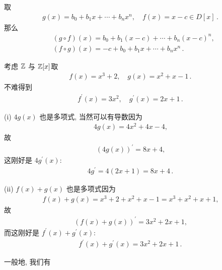 \begin{example}
    取
    \begin{align*}
        g(x) = b_0 + b_1 x + \cdots + b_n x^n, \quad f(x) = x - c \in D[x] \period
    \end{align*}
    那么
    \begin{align*}
         & (g \circ f) (x) = b_0 + b_1 (x-c) + \cdots + b_n (x-c)^n,     \\
         & (f \circ g) (x) = -c + b_0 + b_1 x + \cdots + b_n x^n \period
    \end{align*}
\end{example}

\begin{example}
    考虑 $\mathbb{Z}$ 与 $\mathbb{Z}[x]$\period 取
    \begin{align*}
        f(x) = x^3 + 2, \quad g(x) = x^2 + x - 1 \period
    \end{align*}
    不难得到
    \begin{align*}
        f^{\prime} (x) = 3x^2, \quad g^{\prime} (x) = 2x + 1 \period
    \end{align*}

    (i) $4g(x)$ 也是多项式, 当然可以有导数\period 因为
    \begin{align*}
        4g(x) = 4x^2 + 4x - 4,
    \end{align*}
    故
    \begin{align*}
        (4g(x))^{\prime} = 8x + 4,
    \end{align*}
    这刚好是 $4g^{\prime} (x)$:
    \begin{align*}
        4g^{\prime} = 4(2x + 1) = 8x + 4 \period
    \end{align*}

    (ii) $f(x) + g(x)$ 也是多项式\period 因为
    \begin{align*}
        f(x) + g(x) = x^3 + 2 + x^2 + x - 1 = x^3 + x^2 + x + 1,
    \end{align*}
    故
    \begin{align*}
        (f(x) + g(x))^{\prime} = 3x^2 + 2x + 1,
    \end{align*}
    而这刚好是 $f^{\prime} (x) + g^{\prime} (x)$:
    \begin{align*}
        f^{\prime} (x) + g^{\prime} (x) = 3x^2 + 2x + 1 \period
    \end{align*}
\end{example}

一般地, 我们有


